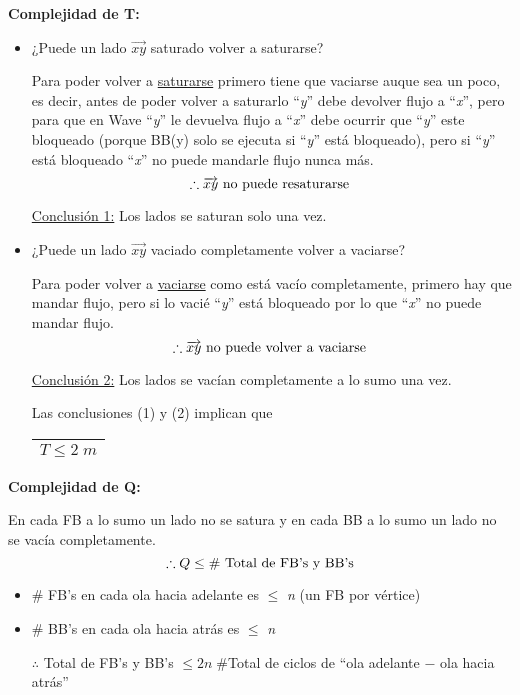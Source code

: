 \documentclass[12pt,a4paper]{report}
\begin{document}
			\vspace{5mm}
			\textbf{Complejidad de T:}
			\begin{itemize}
				\item ¿Puede un lado $\overrightarrow{xy}$ saturado volver a saturarse?
					\par Para poder volver a \underline{saturarse} primero tiene que vaciarse auque sea un poco, es decir, antes de poder volver a saturarlo \textquotedblleft \textit{y}\textquotedblright \; debe devolver flujo a \textquotedblleft \textit{x}\textquotedblright \;, pero para que en Wave \textquotedblleft \textit{y}\textquotedblright \; le devuelva flujo a \textquotedblleft \textit{x}\textquotedblright \;  debe ocurrir que \textquotedblleft \textit{y}\textquotedblright \; este bloqueado (porque BB(y) solo se ejecuta si \textquotedblleft \textit{y}\textquotedblright \; está bloqueado), pero si \textquotedblleft \textit{y}\textquotedblright \; está bloqueado \textquotedblleft \textit{x}\textquotedblright \; no puede mandarle flujo nunca más.
					\[ \therefore \overrightarrow{xy} \textup{ no puede resaturarse } \]
					\par \underline{Conclusión 1:} Los lados se saturan solo una vez.
				\item ¿Puede un lado $\overrightarrow{xy}$ vaciado completamente volver a vaciarse?
					\par Para poder volver a \underline{vaciarse} como está vacío completamente, primero hay que mandar flujo, pero si lo vacié \textquotedblleft \textit{y}\textquotedblright \; está bloqueado por lo que \textquotedblleft \textit{x}\textquotedblright \; no puede mandar flujo.
					\[ \therefore \overrightarrow{xy} \textup{ no puede volver a vaciarse } \]
					\par \underline{Conclusión 2:} Los lados se vacían completamente a lo sumo una vez.

				\par Las conclusiones (1) y (2) implican que \begin{tabular}{|c|} \hline $T \leq 2 \; m$ \\\hline \end{tabular}
			\end{itemize}

			\textbf{Complejidad de Q:}
				\par En cada FB a lo sumo un lado no se satura y en cada BB a lo sumo un lado no se vacía completamente.
				\[ \therefore Q \leq \# \textup{ Total de FB's y BB's} \]
				\begin{itemize}
					\item \# FB's en cada ola hacia adelante es $\leq$ \textit{n} (un FB por vértice)
					\item \# BB's en cada ola hacia atrás es $\leq$ \textit{n}

					\vspace{5mm}
					\par $\therefore$ Total de FB's y BB's $\leq 2 n \; \#$Total de ciclos de \textquotedblleft ola adelante $-$ ola hacia atrás\textquotedblright
	 			\end{itemize}
\end{document}
